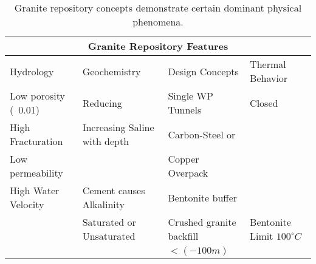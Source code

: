 %
\begin{table}[h!]
  \centering
  \footnotesize{
  \begin{tabular}{|l|l|l|l|}
    \multicolumn{4}{c}{\textbf{Granite Repository Features}}\\
    \hline
    Hydrology & Geochemistry & Design Concepts & Thermal Behavior \\ 
    \hline
    Low porosity (~0.01)&Reducing&Single WP Tunnels&Closed\\
    High Fracturation & Increasing Saline with 
    depth\cite{von_lensa_red-impact_2008} \cite{von_lensa_red-impact_2008}& Carbon-Steel \cite{andra_granite:_2005}or &\\
    Low permeability  && Copper Overpack&\\
    High Water Velocity& Cement causes Alkalinity \cite{andra_granite:_2005}& Bentonite buffer &\\
    & Saturated or Unsaturated & Crushed granite backfill \cite{von_lensa_red-impact_2008}& Bentonite Limit $100^\circ C$\\
    &&$<(-100m)$&\\
    \hline
  \end{tabular}
  \caption[Granite Repository Features]{Granite repository 
  concepts demonstrate certain dominant physical phenomena.}
  \label{tab:granite_tab}
  }
\end{table}



